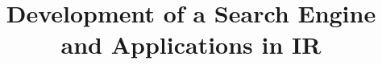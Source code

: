 \documentclass{sig-alternate-05-2015}
\begin{document}






%

\title{Development of a Search Engine and Applications in IR}
%
%
%
%
%
\end{document}
